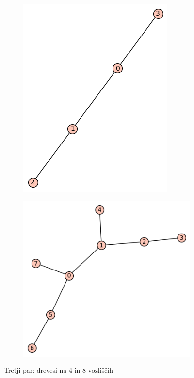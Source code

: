 \documentclass[12pt, a4paper]{article}
\begin{document}
\begin{center}
\begin{center}
\begin{figure}[!htb]
\centering
\begin{subfigure}{0.5\textwidth}
  \centering
  \includegraphics[width=0.4\linewidth]{t-3}
\end{subfigure}%
\begin{subfigure}{0.5\textwidth}
  \centering
  \includegraphics[width=0.5\linewidth]{t-30}
\end{subfigure}
\caption{Tretji par: drevesi na 4 in 8 vozliščih}
\label{fig:test}
\end{figure}
\end{center}


\end{center}
\end{document}
